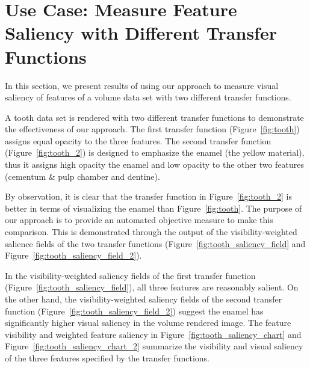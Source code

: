 \section{Use Case: Measure Feature Saliency with Different Transfer Functions}
In this section, we present results of using our approach to measure visual saliency of features of a volume data set with two different transfer functions.

A tooth data set \cite{website:Roettger_volume_2013} is rendered with two different transfer functions to demonstrate the effectiveness of our approach. The first transfer function (Figure~\ref{fig:tooth}) assigns equal opacity to the three features.
The second transfer function (Figure~\ref{fig:tooth_2}) is designed to emphasize the enamel (the yellow material), thus it assigns high opacity the enamel and low opacity to the other two features (cementum \& pulp chamber and dentine).

By observation, it is clear that the transfer function in Figure~\ref{fig:tooth_2} is better in terms of visualizing the enamel than Figure~\ref{fig:tooth}. The purpose of our approach is to provide an automated objective measure to make this comparison. This is demonstrated through the output of the visibility-weighted salience fields of the two transfer functions (Figure~\ref{fig:tooth_saliency_field} and Figure~\ref{fig:tooth_saliency_field_2}).

In the visibility-weighted saliency fields of the first transfer function (Figure~\ref{fig:tooth_saliency_field}), all three features are reasonably salient.
On the other hand, the visibility-weighted saliency fields of the second transfer function (Figure~\ref{fig:tooth_saliency_field_2}) suggest the enamel has significantly higher visual saliency in the volume rendered image.
The feature visibility and weighted feature saliency in Figure~\ref{fig:tooth_saliency_chart} and Figure~\ref{fig:tooth_saliency_chart_2} summarize the visibility and visual saliency of the three features specified by the transfer functions.

